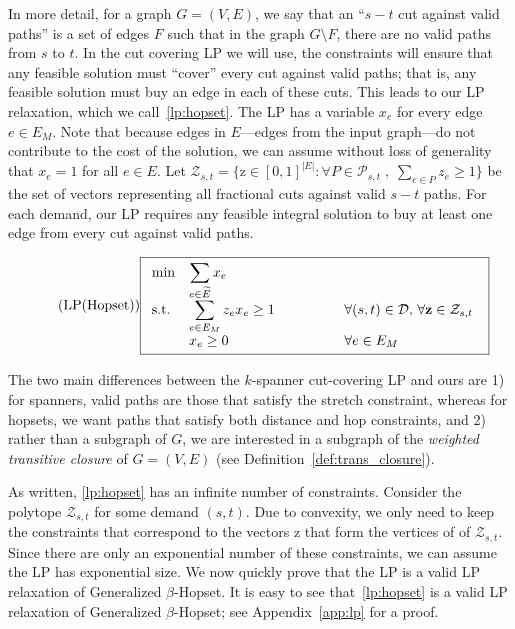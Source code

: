 \documentclass{article}
\theoremstyle{definition}
\theoremstyle{remark}
\newcommand{\quotes}[1]{``#1''}
\def\hopset {{\sc Generalized $\beta$-Hopset}}
\begin{document}
In more detail, for a graph $G = (V,E)$, we say that an \quotes{$s-t$ cut against valid paths} is a set of edges $F$ such that in the graph $G \setminus F$, there are no valid paths from $s$ to $t$. In the cut covering LP we will use, the constraints will ensure that any feasible solution must \quotes{cover} every cut against valid paths; that is, any feasible solution must buy an edge in each of these cuts. This leads to our LP relaxation, which we call~\ref{lp:hopset}. The LP has a variable $x_e$ for every edge $e \in E_M$. Note that because edges in $E$---edges from the input graph---do not contribute to the cost of the solution, we can assume without loss of generality that $x_e = 1$ for all $e \in E$.  
Let $\mathcal{Z}_{s,t} = \{ \bm{\mathrm{z}} \in [0,1]^{|E|} : \forall P \in \mathcal{P}_{s,t} \; , \; \sum_{e \in P} z_e \geq 1 \}$ be the set of vectors representing all fractional cuts against valid $s-t$ paths. For each demand, our LP requires any feasible integral solution to buy at least one edge from every cut against valid paths.

\begin{equation} \label{lp:hopset} \tag{LP(Hopset)}
\fbox{$
\begin{array}{lll}
\min & \displaystyle \sum_{e \in \widetilde{E} } x_e \\
\mathrm{s.t.} & \displaystyle \sum_{e \in E_M} z_e x_e \geq 1 \qquad \qquad & \forall (s,t) \in \mathcal{D}, \, \forall \bm{\mathrm{z}} \in \mathcal{Z}_{s,t} \\
& \displaystyle x_e \geq 0 & \forall e \in E_M \\
\end{array}
$
}
\end{equation}

The two main differences between the $k$-spanner cut-covering LP and ours are 1) for spanners, valid paths are those that satisfy the stretch constraint, whereas for hopsets, we want paths that satisfy both distance and hop constraints, and 2) rather than a subgraph of $G$, we are interested in a subgraph of the \textit{weighted transitive closure} of $G = (V,E)$ (see Definition~\ref{def:trans_closure}). 

As written, \ref{lp:hopset} has an infinite number of constraints. Consider the polytope $\mathcal{Z}_{s,t}$ for some demand $(s,t)$. Due to convexity, we only need to keep the constraints that correspond to the vectors $\bm{\mathrm{z}}$ that form the vertices of of $\mathcal{Z}_{s,t}$. Since there are only an exponential number of these constraints, we can assume the LP has exponential size. \iflong We now quickly prove that the LP is a valid LP relaxation of {\hopset}. \else It is easy to see that~\ref{lp:hopset} is a valid LP relaxation of {\hopset}; see Appendix~\ref{app:lp} for a proof.  \fi
\end{document}
